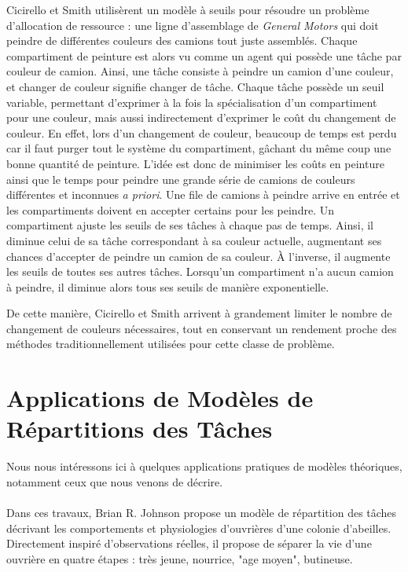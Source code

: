         Cicirello et Smith \cite{cicirello_wasp-like_2004} utilisèrent un modèle à seuils pour résoudre un problème d'allocation de ressource : une ligne d'assemblage de \textit{General Motors} qui doit peindre de différentes couleurs des camions tout juste assemblés. Chaque compartiment de peinture est alors vu comme un agent qui possède une tâche par couleur de camion. Ainsi, une tâche consiste à peindre un camion d'une couleur, et changer de couleur signifie changer de tâche. Chaque tâche possède un seuil variable, permettant d'exprimer à la fois la spécialisation d'un compartiment pour une couleur, mais aussi indirectement d'exprimer le coût du changement de couleur. En effet, lors d'un changement de couleur, beaucoup de temps est perdu car il faut purger tout le système du compartiment, gâchant du même coup une bonne quantité de peinture. L'idée est donc de minimiser les coûts en peinture ainsi que le temps pour peindre une grande série de camions de couleurs différentes et inconnues \textit{a priori}. Une file de camions à peindre arrive en entrée et les compartiments doivent en accepter certains pour les peindre. Un compartiment ajuste les seuils de ses tâches à chaque pas de temps. Ainsi, il diminue celui de sa tâche correspondant à sa couleur actuelle, augmentant ses chances d'accepter de peindre un camion de sa couleur. À l'inverse, il augmente les seuils de toutes ses autres tâches. Lorsqu'un compartiment n'a aucun camion à peindre, il diminue alors tous ses seuils de manière exponentielle.
        
        De cette manière, Cicirello et Smith arrivent à grandement limiter le nombre de changement de couleurs nécessaires, tout en conservant un rendement proche des méthodes traditionnellement utilisées pour cette classe de problème.
        
        
        \section{Applications de Modèles de Répartitions des Tâches}
        \label{sectionAppli}
        Nous nous intéressons ici à quelques applications pratiques de modèles théoriques, notamment ceux que nous venons de décrire. 
        
        \paragraph{}
        Dans ces travaux, Brian R. Johnson \cite{johnson_division_2010} propose un modèle de répartition des tâches décrivant les comportements et physiologies d'ouvrières d'une colonie d'abeilles. Directement inspiré d'observations réelles, il propose de séparer la vie d'une ouvrière en quatre étapes : très jeune, nourrice, "age moyen", butineuse. 
        

